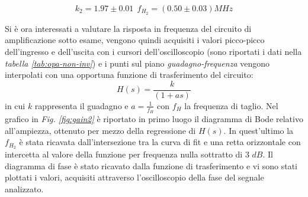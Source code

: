 \documentclass[journal]{IEEEtran}
\begin{document}
\[k_2 = 1.97 \pm 0.01 \: \: f_{H_2} = (0.50 \pm 0.03) MHz\]

Si è ora interessati a valutare la risposta in frequenza del circuito di amplificazione sotto esame, vengono quindi acquisiti i valori picco-picco dell'ingresso e dell'uscita con i cursori dell'oscilloscopio (sono riportati i dati nella \textit{tabella \ref{tab:opa-non-inv}}) e i punti sul piano \textit{guadagno-frequenza} vengono interpolati con una opportuna funzione di trasferimento del circuito:
\[H(s)=\frac{k}{(1+as)}\] 
in cui $k$ rappresenta il guadagno e $a = \frac{1}{f_H}$ con $f_H$ la frequenza di taglio.
Nel grafico in \textit{Fig. \ref{fig:gain2}} è riportato in primo luogo il diagramma di Bode relativo all'ampiezza, ottenuto per mezzo della regressione di $H(s)$. In quest'ultimo la $f_H_2$ è stata ricavata dall'intersezione tra la curva di fit e una retta orizzontale con intercetta al valore della funzione per frequenza nulla sottratto di $3$ $dB$. Il diagramma di fase è stato ricavato dalla funzione di trasferimento e vi sono stati plottati i valori, acquisiti attraverso l'oscilloscopio della fase del segnale analizzato. 
\end{document}
